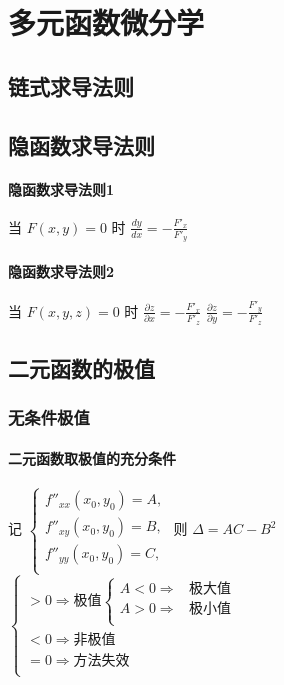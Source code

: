 ﻿\documentclass[a4paper,12pt,UTF8]{ctexart}
\begin{document}
    \section{多元函数微分学}
    
    \subsection{链式求导法则}

    \subsection{隐函数求导法则}

    \paragraph{隐函数求导法则1}当 \(F(x,y)=0\) 时 \(\frac{dy}{dx}=-\frac{F'_x}{F'_y}\)

    \paragraph{隐函数求导法则2}当 \(F(x,y,z)=0\) 时 \(\frac{\partial z}{\partial x}=-\frac{F'_x}{F'_z}\) \(\frac{\partial z}{\partial y}=-\frac{F'_y}{F'_z}\)

    \subsection{二元函数的极值}

    \subsubsection{无条件极值}

    \paragraph{二元函数取极值的充分条件}
    记 
        \(\begin{cases}
            f''_{xx}(x_0,y_0) = A,\\
            f''_{xy}(x_0,y_0) = B,\\
            f''_{yy}(x_0,y_0) = C,\\
        \end{cases}\)
    则 \(\Delta = AC-B^2\) 
        \(\begin{cases}
            >0 \Rightarrow \text{极值}
            \begin{cases}
                A<0 \Rightarrow &\text{极大值}\\
                A>0 \Rightarrow &\text{极小值}\\
            \end{cases}\\
            <0 \Rightarrow \text{非极值}\\
            =0 \Rightarrow \text{方法失效}\\
        \end{cases}\)
    
\end{document}
